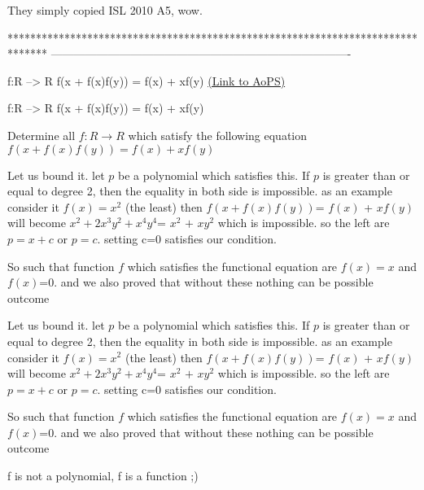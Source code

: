 \begin{solution}
	They simply copied ISL 2010 A5, wow.
\end{solution}
*******************************************************************************
-------------------------------------------------------------------------------

\begin{problem}
	f:R --> R
f(x + f(x)f(y)) = f(x) + xf(y)
	\flushright \href{https://artofproblemsolving.com/community/c6h1632340}{(Link to AoPS)}
\end{problem}



\begin{solution}
	\begin{tcolorbox}f:R --> R
f(x + f(x)f(y)) = f(x) + xf(y)\end{tcolorbox} 

Determine all $f:R\rightarrow R$ which satisfy the following equation
$f(x+f(x)f(y))=f(x)+xf(y)$
\end{solution}



\begin{solution}
	Let us bound it. let $p$ be a polynomial which satisfies this. If $p$ is greater than or equal to degree 2, then the equality in both side is impossible. as an example consider it $f(x)=x^2$ (the least) then 
$f(x+f(x)f(y))$= $f(x)$ + $xf(y)$ will become 
$x^2+2x^3y^2+x^4y^4$= $x^2$ $+$ $xy^2$ which is impossible. so the left are $p=x+c$ or $p=c$. setting c=0 satisfies our condition. 

So such that function $f$ which satisfies the functional equation are $f(x)=x$ and $f(x)$=0. and we also proved that without these nothing can be possible outcome
\end{solution}



\begin{solution}
	\begin{tcolorbox}Let us bound it. let $p$ be a polynomial which satisfies this. If $p$ is greater than or equal to degree 2, then the equality in both side is impossible. as an example consider it $f(x)=x^2$ (the least) then 
$f(x+f(x)f(y))$= $f(x)$ + $xf(y)$ will become 
$x^2+2x^3y^2+x^4y^4$= $x^2$ $+$ $xy^2$ which is impossible. so the left are $p=x+c$ or $p=c$. setting c=0 satisfies our condition. 

So such that function $f$ which satisfies the functional equation are $f(x)=x$ and $f(x)$=0. and we also proved that without these nothing can be possible outcome\end{tcolorbox}
f is not a polynomial, f is a function ;)

\end{solution}



